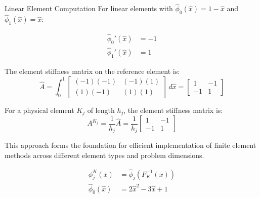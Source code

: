 \begin{example}{Linear Element Computation}{}
  For linear elements with $\hat{\phi}_0(\hat{x}) = 1-\hat{x}$ and $\hat{\phi}_1(\hat{x}) = \hat{x}$:

  \begin{align*}
    \hat{\phi}_0'(\hat{x}) & = -1 \\
    \hat{\phi}_1'(\hat{x}) & = 1
  \end{align*}

  The element stiffness matrix on the reference element is:
  \[
    \hat{A} = \int_0^1
    \begin{bmatrix}
      (-1)(-1) & (-1)(1) \\
      (1)(-1)  & (1)(1)
    \end{bmatrix}
    \, d\hat{x} =
    \begin{bmatrix}
      1  & -1 \\
      -1 & 1
    \end{bmatrix}
  \]

  For a physical element $K_j$ of length $h_j$, the element stiffness matrix is:
  \[
    A^{K_j} = \frac{1}{h_j}\hat{A} = \frac{1}{h_j}
    \begin{bmatrix}
      1  & -1 \\
      -1 & 1
    \end{bmatrix}
  \]

  This approach forms the foundation for efficient implementation of finite element methods across different element types and problem dimensions.
  
  \begin{align*}
    \phi_j^K(x)           & = \hat{\phi}_j(F_K^{-1}(x)) \\
    \hat{\phi}_0(\hat{x}) & = 2\hat{x}^2 - 3\hat{x} + 1
  \end{align*}
\end{example}
